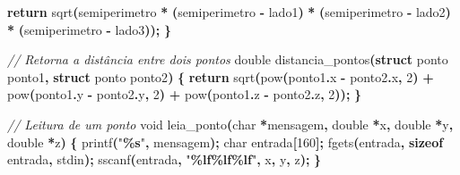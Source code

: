 \documentclass[
  11pt,
  a4paper,
]{scrbook}
\newenvironment{Shaded}{\begin{snugshade}}{\end{snugshade}}
\newcommand{\CommentTok}[1]{\textcolor[rgb]{0.56,0.35,0.01}{\textit{#1}}}
\newcommand{\ControlFlowTok}[1]{\textcolor[rgb]{0.13,0.29,0.53}{\textbf{#1}}}
\newcommand{\DataTypeTok}[1]{\textcolor[rgb]{0.13,0.29,0.53}{#1}}
\newcommand{\DecValTok}[1]{\textcolor[rgb]{0.00,0.00,0.81}{#1}}
\newcommand{\KeywordTok}[1]{\textcolor[rgb]{0.13,0.29,0.53}{\textbf{#1}}}
\newcommand{\NormalTok}[1]{#1}
\newcommand{\OperatorTok}[1]{\textcolor[rgb]{0.81,0.36,0.00}{\textbf{#1}}}
\newcommand{\SpecialCharTok}[1]{\textcolor[rgb]{0.81,0.36,0.00}{\textbf{#1}}}
\newcommand{\StringTok}[1]{\textcolor[rgb]{0.31,0.60,0.02}{#1}}
\begin{document}
\begin{Shaded}
\begin{Highlighting}[]
    \ControlFlowTok{return}\NormalTok{ sqrt}\OperatorTok{(}\NormalTok{semiperimetro }\OperatorTok{*} \OperatorTok{(}\NormalTok{semiperimetro }\OperatorTok{{-}}\NormalTok{ lado1}\OperatorTok{)} \OperatorTok{*}
                \OperatorTok{(}\NormalTok{semiperimetro }\OperatorTok{{-}}\NormalTok{ lado2}\OperatorTok{)} \OperatorTok{*} \OperatorTok{(}\NormalTok{semiperimetro }\OperatorTok{{-}}\NormalTok{ lado3}\OperatorTok{));}
\OperatorTok{\}}

\CommentTok{// Retorna a distância entre dois pontos}
\DataTypeTok{double}\NormalTok{ distancia\_pontos}\OperatorTok{(}\KeywordTok{struct}\NormalTok{ ponto ponto1}\OperatorTok{,} \KeywordTok{struct}\NormalTok{ ponto ponto2}\OperatorTok{)} \OperatorTok{\{}
    \ControlFlowTok{return}\NormalTok{ sqrt}\OperatorTok{(}\NormalTok{pow}\OperatorTok{(}\NormalTok{ponto1}\OperatorTok{.}\NormalTok{x }\OperatorTok{{-}}\NormalTok{ ponto2}\OperatorTok{.}\NormalTok{x}\OperatorTok{,} \DecValTok{2}\OperatorTok{)} \OperatorTok{+}
\NormalTok{                pow}\OperatorTok{(}\NormalTok{ponto1}\OperatorTok{.}\NormalTok{y }\OperatorTok{{-}}\NormalTok{ ponto2}\OperatorTok{.}\NormalTok{y}\OperatorTok{,} \DecValTok{2}\OperatorTok{)} \OperatorTok{+}
\NormalTok{                pow}\OperatorTok{(}\NormalTok{ponto1}\OperatorTok{.}\NormalTok{z }\OperatorTok{{-}}\NormalTok{ ponto2}\OperatorTok{.}\NormalTok{z}\OperatorTok{,} \DecValTok{2}\OperatorTok{));}
\OperatorTok{\}}

\CommentTok{// Leitura de um ponto}
\DataTypeTok{void}\NormalTok{ leia\_ponto}\OperatorTok{(}\DataTypeTok{char} \OperatorTok{*}\NormalTok{mensagem}\OperatorTok{,} \DataTypeTok{double} \OperatorTok{*}\NormalTok{x}\OperatorTok{,} \DataTypeTok{double} \OperatorTok{*}\NormalTok{y}\OperatorTok{,} \DataTypeTok{double} \OperatorTok{*}\NormalTok{z}\OperatorTok{)} \OperatorTok{\{}
\NormalTok{    printf}\OperatorTok{(}\StringTok{"}\SpecialCharTok{\%s}\StringTok{"}\OperatorTok{,}\NormalTok{ mensagem}\OperatorTok{);}
    \DataTypeTok{char}\NormalTok{ entrada}\OperatorTok{[}\DecValTok{160}\OperatorTok{];}
\NormalTok{    fgets}\OperatorTok{(}\NormalTok{entrada}\OperatorTok{,} \KeywordTok{sizeof}\NormalTok{ entrada}\OperatorTok{,}\NormalTok{ stdin}\OperatorTok{);}
\NormalTok{    sscanf}\OperatorTok{(}\NormalTok{entrada}\OperatorTok{,} \StringTok{"}\SpecialCharTok{\%lf\%lf\%lf}\StringTok{"}\OperatorTok{,}\NormalTok{ x}\OperatorTok{,}\NormalTok{ y}\OperatorTok{,}\NormalTok{ z}\OperatorTok{);}
\OperatorTok{\}}
\end{Highlighting}
\end{Shaded}
\end{document}
